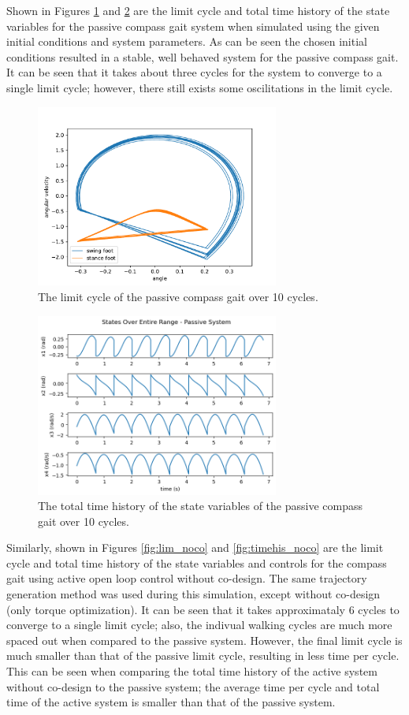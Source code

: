 \documentclass{./springer/svjour3}
\begin{document}
Shown in Figures \ref{fig:limcyc_passive} and \ref{fig:timehis_passive} are the limit cycle and total time history of the state variables for the passive compass gait system when simulated using the 
given initial conditions and system parameters. As can be seen the chosen initial conditions resulted in a stable, well behaved system for the passive compass gait. It can be 
seen that it takes about three cycles for the system to converge to a single limit cycle; however, there still exists some oscilitations in the limit cycle.

\begin{figure}[h]
\centering
\includegraphics[width=8cm]{./figures/limitcycle_passivesim.pdf}
\caption{The limit cycle of the passive compass gait over 10 cycles.}
\label{fig:limcyc_passive}
\end{figure}

\begin{figure}[h]
\centering
\includegraphics[width=8cm]{./figures/timehis_passivesim.png}
\caption{The total time history of the state variables of the passive compass gait over 10 cycles.}
\label{fig:timehis_passive}
\end{figure}

Similarly, shown in Figures \ref{fig:lim_noco} and \ref{fig:timehis_noco} are the limit cycle and total time history of the state variables and controls for the compass gait 
using active open loop control without co-design. The same trajectory generation method was used during this simulation, except without co-design (only torque optimization).
It can be seen that it takes approximataly 6 cycles to converge to a single limit cycle; also, the indivual walking cycles are much more spaced out when compared to the passive system.
However, the final limit cycle is much smaller than that of the passive limit cycle, resulting in less time per cycle. This can be seen when comparing the total time history of the 
active system without co-design to the passive system; the average time per cycle and total time of the active system is smaller than that of the passive system.
\end{document}
